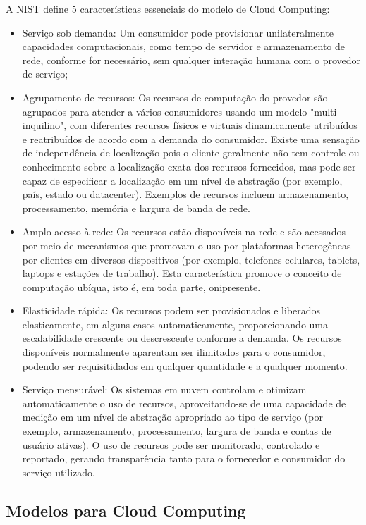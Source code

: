 A NIST define 5 características essenciais do modelo de Cloud Computing:
\begin{itemize}
	\item Serviço sob demanda: Um consumidor pode provisionar unilateralmente capacidades computacionais, como tempo de servidor e armazenamento de rede, conforme for necessário, sem qualquer interação humana com o provedor de serviço;
	\item Agrupamento de recursos: Os recursos de computação do provedor são agrupados para atender a vários consumidores usando um modelo "multi inquilino", com diferentes recursos físicos e virtuais dinamicamente atribuídos e reatribuídos de acordo com a demanda do consumidor. Existe uma sensação de independência de localização pois o cliente geralmente não tem controle ou conhecimento sobre a localização exata dos recursos fornecidos, mas pode ser capaz de especificar a localização em um nível de abstração (por exemplo, país, estado ou datacenter). Exemplos de recursos incluem armazenamento, processamento, memória e largura de banda de rede.
	\item Amplo acesso à rede: Os recursos estão disponíveis na rede e são acessados por meio de mecanismos que promovam o uso por plataformas heterogêneas por clientes em diversos dispositivos (por exemplo, telefones celulares, tablets, laptops e estações de trabalho). Esta característica promove o conceito de computação ubíqua, isto é, em toda parte, onipresente.
	\item Elasticidade rápida: Os recursos podem ser provisionados e liberados elasticamente, em alguns casos automaticamente, proporcionando uma escalabilidade crescente ou descrescente conforme a demanda. Os recursos disponíveis normalmente aparentam ser ilimitados para o consumidor, podendo ser requisitidados em qualquer quantidade e a qualquer momento.
	\item Serviço mensurável: Os sistemas em nuvem controlam e otimizam automaticamente o uso de recursos, aproveitando-se de uma capacidade de medição em um nível de abstração apropriado ao tipo de serviço (por exemplo, armazenamento, processamento, largura de banda e contas de usuário ativas). O uso de recursos pode ser monitorado, controlado e reportado, gerando transparência tanto para o fornecedor e consumidor do serviço utilizado.
\end{itemize}

\subsection{Modelos para Cloud Computing}

